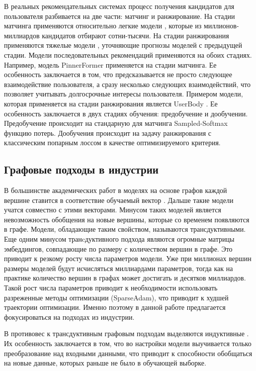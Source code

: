 \documentclass{article}
\begin{document}
В реальных рекомендательных системах процесс получения кандидатов для пользователя разбивается на две части: матчинг и ранжирование.
На стадии матчинга применяются относительно легкие модели \cite{xwalk,logQ}, которые из миллионов-миллиардов кандидатов отбирают сотни-тысячи. 
На стадии ранжирования применяются тяжелые модели \cite{dcnv2,masknet,catboost}, уточняющие прогнозы моделей с предыдущей стадии. Модели
последовательных рекомендаций применяются на обоих стадиях. Например, модель PinnerFormer \cite{pinnerformer} применяется на стадии 
матчинга. Ее особенность заключается в том, что предсказывается не просто следующее взаимодействие пользователя, а сразу несколько следующих
взаимодействий, что позволяет учитывать долгосрочные интересы пользователя. Примером модели, которая применяется на стадии ранжирования является
UserBody \cite{yandex}. Ее особенность заключается в двух стадиях обучения: предобучение и дообучении. Предобучение происходит на стандарную для
матчинга Sampled-Softmax функцию потерь. Дообучения происходит на задачу ранжирования с классическим попарным лоссом в качестве оптимизируемого критерия.

\subsection{Графовые подходы в индустрии}

В большинстве академических работ в моделях на основе графов каждой вершине ставится в соответствие обучаемый вектор \cite{lightgcn}. 
Дальше такие модели учатся совместно с этими векторами. Минусом таких моделей является невозможность обобщения на новые вершины, 
которые со временем появляются в графе. Модели, обладающие таким свойством, называются трансдуктивными. Еще одним минусом транcдуктивного
подхода являются огромные матрицы эмбеддингов, совпадающие по размеру с количеством вершин в графе. Это приводит к резкому росту
числа параметров модели. Уже при миллионах вершин размеры моделей будут исчисляться миллиардами параметров, тогда как на практике количество
вершин в графах может достигать и десятков миллиардов. Такой рост числа параметров приводит к необходимости использовать разреженные
методы оптимизации (SparseAdam), что приводит к худшей траектории оптимизации. Именно поэтому в данной работе предлагается фокусироваться
на подходах из индустрии.

В противовес к трансдуктивным графовым подходам выделяются индуктивные \cite{sage}. Их особенность заключается в том, что во настройки модели
выучивается только преобразование над входными данными, что приводит к способности обобщаться на новые данные, которых раньше не было в обучающей выборке.
\end{document}
